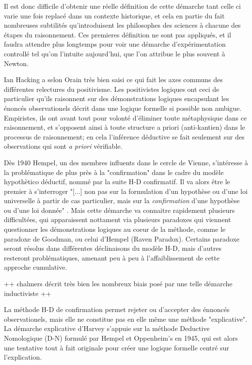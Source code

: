 {Il est donc difficile d'obtenir une réelle définition de cette démarche tant celle ci varie une fois replacé dans un contexte historique, et cela en partie du fait nombreuses subtilités qu'introduisent les philosophes des sciences à chacune des étapes du raisonnement.  Ces premieres définition ne sont pas appliqués, et il faudra attendre plus longtemps pour voir une démarche d'expérimentation controllé tel qu'on l'intuite aujourd'hui, que l'on attribue le plus souvent à Newton.

Ian Hacking a selon Orain très bien saisi ce qui fait les axes communs des différentes relectures du positivisme. Les positivistes logiques ont ceci de particulier qu'ils raisonnent sur des démonstrations logiques encapsulant les énoncés observationels décrit dans une logique formelle si possible non ambigue. Empiristes, ils ont avant tout pour volonté d'éliminer toute métaphysique dans ce raisonnement, et s'opposent ainsi à toute structure a priori (anti-kantien) dans le processus de raisonnement; en cela l'inférence déductive se fait seulement sur des observations qui sont \textit{a priori} vérifiable.

Dès 1940 Hempel, un des membres influents dans le cercle de Vienne, s'intéresse à la problématique de plus près à la "confirmation" dans le cadre du modèle hypothètico déductif, nommé par la suite H-D confirmatif. Il va alors être le premier à s'interroger "[...] non pas sur la formulation d'un hypothèse ou d'une loi universelle à partir de cas particulier, mais sur la \textit{confirmation} d'une hypothèse ou d'une loi donnée" \autocite{Lecourt2012}. Mais cette démarche va connaitre rapidement plusieurs difficultées, qui apparaissent nottament via plusieurs paradoxes qui viennent questionner les démonstrations logiques au coeur de la méthode, comme le paradoxe de Goodman, ou celui d'Hempel (Raven Paradox). Certains paradoxe seront résolus dans différentes déclinaisons du modèle H-D, mais d'autres resteront problématiques, amenant peu à peu à l'affaiblissement de cette approche cumulative. 

++ chalmers décrit très bien les nombreux biais posé par une telle démarche inductiviste ++

La méthode H-D de confirmation permet rejeter ou d'accepter des énnoncés observationels, mais elle ne constitue pas en elle même une méthode "explicative". La démarche explicative d'Harvey s'appuie sur la méthode Deductive Nomologique (D-N) formulé par Hempel et Oppenheim’s en 1945, qui est alors une tentative tout à fait originale pour créer une logique formelle centré sur l'explication.

}
